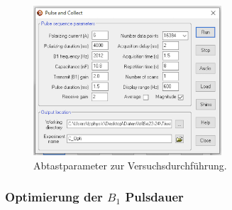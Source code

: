 \documentclass{article}
\begin{document}
            
            \begin{figure}[H]
                \centering
                \includegraphics[width=7cm]{../Bilddateien/C_Abtastparameter.png}
                \caption{Abtastparameter zur Versuchsdurchführung.}
                \label{fig:5.1:Abtastparameter}
            \end{figure}

        \subsubsection*{Optimierung der $B_1$ Pulsdauer}\label{subsubsec:5:B1PulsdauerOptimierung}
\end{document}
